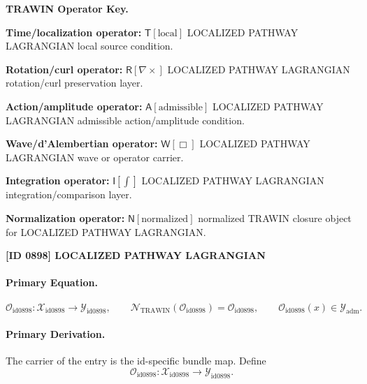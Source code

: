 \par\vspace{0.45\baselineskip}
\noindent\begin{minipage}[t]{\linewidth}
\begingroup
\small
\raggedright
\textbf{TRAWIN Operator Key.}\par
\noindent\textbf{Time/localization operator:} $\mathsf{T}\!\left[\mathrm{local}\right]$ LOCALIZED PATHWAY LAGRANGIAN local source condition.\par
\noindent\textbf{Rotation/curl operator:} $\mathsf{R}\!\left[\nabla\times\right]$ LOCALIZED PATHWAY LAGRANGIAN rotation/curl preservation layer.\par
\noindent\textbf{Action/amplitude operator:} $\mathsf{A}\!\left[\mathrm{admissible}\right]$ LOCALIZED PATHWAY LAGRANGIAN admissible action/amplitude condition.\par
\noindent\textbf{Wave/d'Alembertian operator:} $\mathsf{W}\!\left[\Box\right]$ LOCALIZED PATHWAY LAGRANGIAN wave or operator carrier.\par
\noindent\textbf{Integration operator:} $\mathsf{I}\!\left[\int\right]$ LOCALIZED PATHWAY LAGRANGIAN integration/comparison layer.\par
\noindent\textbf{Normalization operator:} $\mathsf{N}\!\left[\mathrm{normalized}\right]$ normalized TRAWIN closure object for LOCALIZED PATHWAY LAGRANGIAN.\par
\endgroup
\end{minipage}

\clearpage
\noindent\textbf{[ID 0898] LOCALIZED PATHWAY LAGRANGIAN}\par
\vspace{0.35em}
\paragraph{Primary Equation.}
\[
\mathcal{O}_{\mathrm{id0898}}:\mathcal{X}_{\mathrm{id0898}}\longrightarrow \mathcal{Y}_{\mathrm{id0898}},\qquad
\mathcal{N}_{\mathrm{TRAWIN}}(\mathcal{O}_{\mathrm{id0898}})=\mathcal{O}_{\mathrm{id0898}},\qquad
\mathcal{O}_{\mathrm{id0898}}(x)\in\mathcal{Y}_{\mathrm{adm}}.
\]

\paragraph{Primary Derivation.} The carrier of the entry is the id-specific bundle map.  Define\[
\mathcal{O}_{\mathrm{id0898}}:\mathcal{X}_{\mathrm{id0898}}\longrightarrow \mathcal{Y}_{\mathrm{id0898}}.
\]

